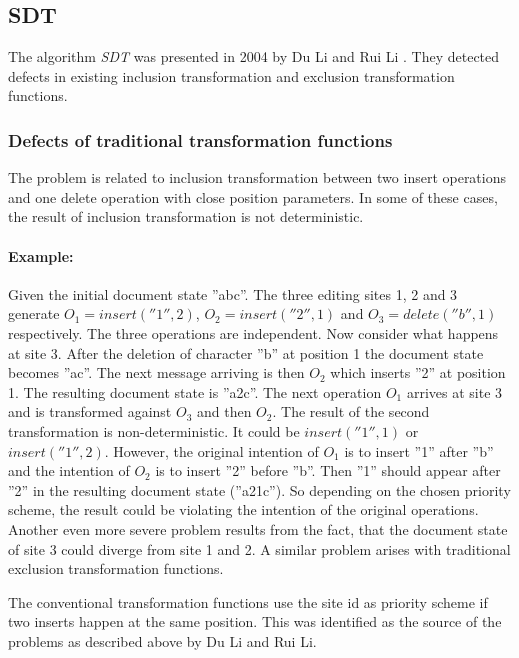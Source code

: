 \subsection{SDT}
\label{algo:sdt}

The algorithm \emph{SDT} was presented in 2004 by Du Li and Rui Li \cite{sdt}. They detected defects in existing inclusion transformation and exclusion transformation functions. 

\subsubsection{Defects of traditional transformation functions}
The problem is related to inclusion transformation between two insert operations and one delete operation with close position parameters. In some of these cases, the result of inclusion transformation is not deterministic. 

\paragraph{Example: } Given the initial document state ''abc''. The three editing sites 1, 2 and 3 generate $O_{1} = insert(''1'',2)$, $O_{2} = insert(''2'',1)$ and $O_{3} = delete(''b'',1)$ respectively. The three operations are independent. Now consider what happens at site 3. After the deletion of character ''b'' at position 1 the document state becomes ''ac''. The next message arriving is then $O_{2}$ which inserts ''2'' at position 1. The resulting document state is ''a2c''. The next operation $O_{1}$ arrives at site 3 and is transformed against $O_{3}$ and then $O_{2}$. The result of the second transformation is non-deterministic. It could be $insert(''1'',1)$ or $insert(''1'',2)$. However, the original intention of $O_{1}$ is to insert ''1'' after ''b'' and the intention of $O_{2}$ is to insert ''2'' before ''b''. Then ''1'' should appear after ''2'' in the resulting document state (''a21c''). So depending on the chosen priority scheme, the result could be violating the intention of the original operations. Another even more severe problem results from the fact, that the document state of site 3 could diverge from site 1 and 2. A similar problem arises with traditional exclusion transformation functions.

The conventional transformation functions use the site id as priority scheme if two inserts happen at the same position. This was identified as the source of the problems as described above by Du Li and Rui Li. 


